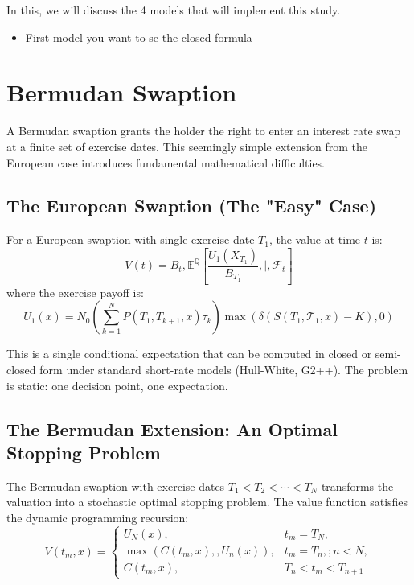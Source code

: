 In this, we will discuss the 4 models that will implement this study. 

\begin{itemize}
    \item First model you want to se the closed formula 
\end{itemize}

\section{Bermudan Swaption} 
                  
  A Bermudan swaption grants the holder the right to enter an interest rate swap at a finite set of exercise dates. This seemingly simple extension from the European case introduces       
  fundamental mathematical difficulties.
  \subsection{The European Swaption (The "Easy" Case)}

  For a European swaption with single exercise date $T_1$, the value at time $t$ is:
    \begin{equation}
    V(t) = B_t , \mathbb{E}^{\mathbb{Q}}\left[\frac{U_1(X_{T_1})}{B_{T_1}} ,\Big|, \mathcal{F}_t\right]    
    \end{equation}
  \noindent
  where the exercise payoff is:
  \begin{equation}
    U_1(x) = N_0 \left(\sum_{k=1}^{N} P(T_1, T_{k+1}, x)\tau_k\right) \max(\delta(S(T_1, \mathcal{T}_1, x) - K), 0)  
  \end{equation}

  \noindent
  This is a single conditional expectation that can be computed in closed or semi-closed form under standard short-rate models (Hull-White, G2++). The problem is static: one decision point, one
  expectation.

\subsection{The Bermudan Extension: An Optimal Stopping Problem}

  The Bermudan swaption with exercise dates $T_1 < T_2 < \cdots < T_N$ transforms the valuation into a stochastic optimal stopping problem. The value function satisfies the dynamic programming recursion:
  \begin{equation}
      V(t_m, x) = \begin{cases} 
                      U_N(x), & t_m = T_N,  \\
                      \max(C(t_m, x),, U_n(x)), & t_m = T_n,; n < N, \\
                      C(t_m, x), & T_n < t_m < T_{n+1} 
                  \end{cases}
  \end{equation}


